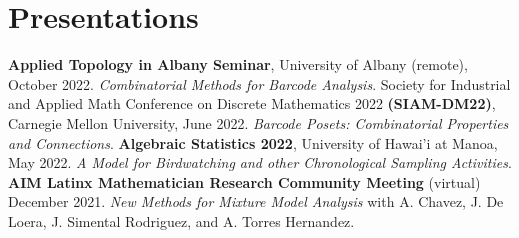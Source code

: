 \documentclass[11pt,letter]{moderncv}
\begin{document}
\section{Presentations}
\vspace{0.05in}
{\textbf{Applied Topology in Albany Seminar}, University of Albany (remote), October 2022.  \emph{Combinatorial Methods for Barcode Analysis}.}
\vspace{0.05in}
\cvitem{}
{Society for Industrial and Applied Math Conference on Discrete Mathematics 2022 \textbf{(SIAM-DM22)}, Carnegie Mellon University, June 2022.  \emph{Barcode Posets: Combinatorial Properties and Connections}.}
\vspace{0.05in}
\cvitem{}
{\textbf{Algebraic Statistics 2022}, University of Hawai'i at Manoa, May 2022.  \emph{A Model for Birdwatching and other Chronological Sampling Activities}.}
\vspace{0.05in}
{ \textbf{AIM Latinx Mathematician Research Community Meeting} (virtual) December 2021.  \emph{New Methods for Mixture Model Analysis} with A. Chavez, J. De Loera,  J. Simental Rodriguez, and A. Torres Hernandez. }
\vspace{0.05in}
\vspace{0.05in}
\vspace{0.05in}

\newpage
\end{document}
